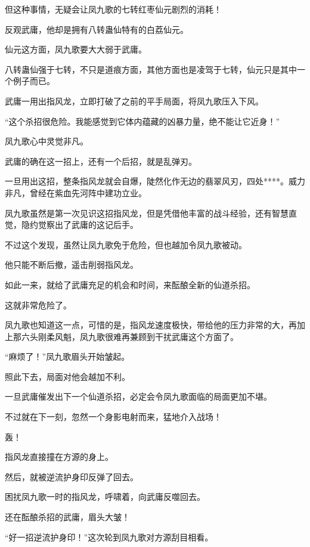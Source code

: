 \begin{this_body}
但这种事情，无疑会让凤九歌的七转红枣仙元剧烈的消耗！

反观武庸，他却是拥有八转蛊仙特有的白荔仙元。

仙元这方面，凤九歌要大大弱于武庸。

八转蛊仙强于七转，不只是道痕方面，其他方面也是凌驾于七转，仙元只是其中一个例子而已。

武庸一用出指风龙，立即打破了之前的平手局面，将凤九歌压入下风。

“这个杀招很危险。我能感觉到它体内蕴藏的凶暴力量，绝不能让它近身！”

凤九歌心中灵觉非凡。

武庸的确在这一招上，还有一个后招，就是乱弹刃。

一旦用出这招，整条指风龙就会自爆，陡然化作无边的翡翠风刃，四处****。威力非凡，曾经在紫血先河阵中建功立业。

凤九歌虽然是第一次见识这招指风龙，但是凭借他丰富的战斗经验，还有智慧直觉，隐约觉察出了武庸的这记后手。

不过这个发现，虽然让凤九歌免于危险，但也越加令凤九歌被动。

他只能不断后撤，遥击削弱指风龙。

如此一来，就给了武庸充足的机会和时间，来酝酿全新的仙道杀招。

这就非常危险了。

凤九歌也知道这一点，可惜的是，指风龙速度极快，带给他的压力非常的大，再加上那六头刚柔风魁，凤九歌很难再兼顾到干扰武庸这个方面了。

“麻烦了！”凤九歌眉头开始皱起。

照此下去，局面对他会越加不利。

一旦武庸催发出下一个仙道杀招，必定会令凤九歌面临的局面更加不堪。

不过就在下一刻，忽然一个身影电射而来，猛地介入战场！

轰！

指风龙直接撞在方源的身上。

然后，就被逆流护身印反弹了回去。

困扰凤九歌一时的指风龙，呼啸着，向武庸反噬回去。

还在酝酿杀招的武庸，眉头大皱！

“好一招逆流护身印！”这次轮到凤九歌对方源刮目相看。

\end{this_body}

